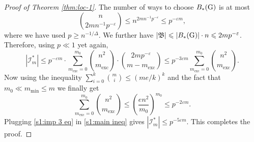 \documentclass[a4paper,11pt,english,reqno]{amsart}
\numberwithin{equation}{section}
\renewcommand{\leq}{\leqslant}
\renewcommand{\geq}{\geqslant}
\newcommand{\I}{\mathcal{I}}
\newcommand{\uH}{\textup{H}}
\newcommand{\tu}[1]{\textup{#1}}
\begin{document}
\begin{proof}[Proof of Theorem \ref{thm:loc-1}]
				The number of ways to choose $B_{*}(\tu{G})$ is at most 
				\begin{equation*}
					{n\choose 2mn^{-1}p^{-\varepsilon}}\leq n^{2mn^{-1}p^{-\varepsilon}} \leq p^{-\varepsilon m},
				\end{equation*}
				where we have used $p\geq n^{-1/\Delta}$. We further have $|\mathfrak{B}|\leq |B_{*}(\tu{G})|\cdot n \leq 2mp^{-\varepsilon}$. Therefore, using $p \ll 1$ yet again, 
				\begin{equation}
					\label{s1:main ineq}
					|\I^{*}_{m}|\leq p^{-\varepsilon m}\cdot \sum_{m_{\text{exc}}=0}^{m_{0}}{n^{2}\choose m_{\text{exc}}}\cdot { 2mp^{-\varepsilon}\choose m-m_{\text{exc}}}\leq p^{-3\varepsilon m} \sum_{m_{\text{exc}}=0}^{m_{0}}{n^{2}\choose m_{\text{exc}}}.
				\end{equation}
				Now using the inequality $\sum_{i=0}^{k}{m\choose i}\leq(me/k)^{k}$ and the fact that $m_0 \ll m_{\min} \le m$ we  finally get
				\begin{equation}
					\label{s1:imp 3 eq}
					\sum_{m_{\text{exc}}=0}^{m_{0}}{n^{2}\choose m_{\text{exc}}}\leq \left(\frac{en^{2}}{m_{0}}\right)^{m_{0}}\leq p^{-2\varepsilon m}.
				\end{equation}
				Plugging \eqref{s1:imp 3 eq} in \eqref{s1:main ineq} gives $|\I^{*}_{m}|\leq p^{-5\varepsilon m}$. This completes the proof.
			\end{proof}
			
\end{document}

